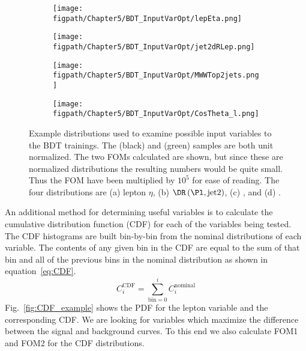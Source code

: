 \begin{figure}[!hbt]
    \centering
    \begin{subfigure}[t]{0.48\textwidth}
        \texttt{[image: \\figpath/Chapter5/BDT\_InputVarOpt/lepEta.png]}
        \caption{}
        \label{fig:BDT_FOM_lepEta}
    \end{subfigure}
    \begin{subfigure}[t]{0.48\textwidth}
        \texttt{[image: \\figpath/Chapter5/BDT\_InputVarOpt/jet2dRLep.png]}
        \caption{}
        \label{fig:BDT_FOM_DeltaRLepJet}
    \end{subfigure}

    \begin{subfigure}[t]{0.48\textwidth}
        \texttt{[image: \\figpath/Chapter5/BDT\_InputVarOpt/MWWTop2jets.png]}
        \caption{}
        \label{fig:BDT_FOM_Mlvjj}
    \end{subfigure}
    \begin{subfigure}[t]{0.48\textwidth}
        \texttt{[image: \\figpath/Chapter5/BDT\_InputVarOpt/CosTheta\_l.png]}
        \caption{}
        \label{fig:BDT_FOM_CosThetaL}
    \end{subfigure}
    \caption{Example distributions used to examine possible input variables to the BDT trainings. The \ggH (black) and \Wjets (green) samples are both unit normalized. The two FOMs calculated are shown, but since these are normalized distributions the resulting numbers would be quite small. Thus the FOM have been multiplied by $10^{5}$ for ease of reading. The four distributions are (a) lepton $\eta$, (b) $\DR\left(\Pl,\text{jet2}\right)$, (c) \Mlvjj, and (d) \costhetal.}
    \label{fig:BDT_FOM}
\end{figure}

An additional method for determining useful variables is to calculate the cumulative distribution function (CDF) for each of the variables being tested.
The CDF histograms are built bin-by-bin from the nominal distributions of each variable.
The contents of any given bin in the CDF are equal to the sum of that bin and all of the previous bins in the nominal distribution as shown in equation~\ref{eq:CDF}.
\begin{equation}\label{eq:CDF}
  C_{i}^{\text{CDF}}=\sum_{\text{bin}=0}^{i}C_{i}^{\text{nominal}}
\end{equation}
Fig.~\ref{fig:CDF_example} shows the PDF for the lepton \pt variable and the corresponding CDF.
We are looking for variables which maximize the difference between the signal and background curves.
To this end we also calculate FOM1 and FOM2 for the CDF distributions.

